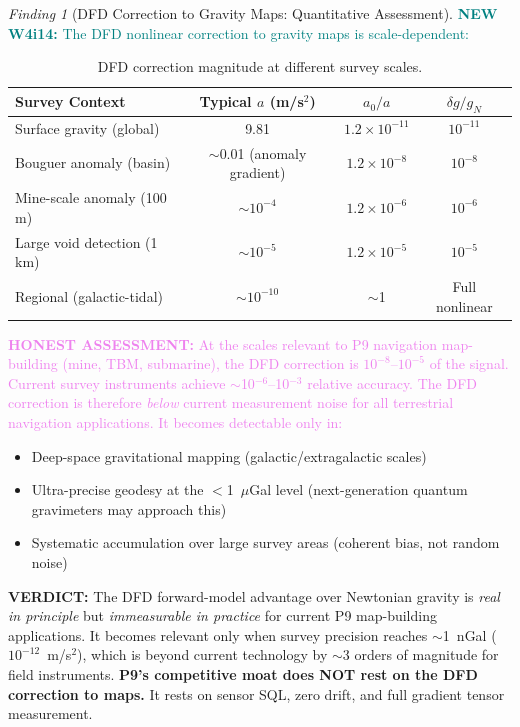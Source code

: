 \documentclass[11pt]{article}
\theoremstyle{definition}
\theoremstyle{remark}
\newtheorem{finding}[theorem]{Finding}
\newcommand{\ee}[1]{\times10^{#1}}
\newcommand{\honest}[1]{\textcolor{violet}{\textbf{HONEST ASSESSMENT:} #1}}
\newcommand{\verdict}[1]{\textcolor{green!50!black}{\textbf{VERDICT:} #1}}
\newcommand{\newfinding}[1]{\textcolor{teal}{\textbf{NEW W4i14:} #1}}
\begin{document}
\begin{finding}[DFD Correction to Gravity Maps: Quantitative Assessment]
\label{find:dfd-correction}
\newfinding{The DFD nonlinear correction to gravity maps is
scale-dependent:}

\begin{table}[H]
\centering
\caption{DFD correction magnitude at different survey scales.}
\label{tab:dfd-corrections}
\begin{tabular}{@{}lccc@{}}
\toprule
Survey Context & Typical $a$ (m/s$^2$) & $a_0/a$ & $\delta g/g_N$ \\
\midrule
Surface gravity (global) & 9.81 & $1.2\ee{-11}$ & $10^{-11}$ \\
Bouguer anomaly (basin) & $\sim$0.01 (anomaly gradient) & $1.2\ee{-8}$ & $10^{-8}$ \\
Mine-scale anomaly (100\,m) & $\sim$$10^{-4}$ & $1.2\ee{-6}$ & $10^{-6}$ \\
Large void detection (1\,km) & $\sim$$10^{-5}$ & $1.2\ee{-5}$ & $10^{-5}$ \\
Regional (galactic-tidal) & $\sim$$10^{-10}$ & $\sim$1 & Full nonlinear \\
\bottomrule
\end{tabular}
\end{table}

\honest{At the scales relevant to P9 navigation map-building (mine,
TBM, submarine), the DFD correction is $10^{-8}$--$10^{-5}$ of the
signal. Current survey instruments achieve $\sim$10$^{-6}$--10$^{-3}$
relative accuracy. The DFD correction is therefore \emph{below}
current measurement noise for all terrestrial navigation applications.
It becomes detectable only in:}
\begin{itemize}[nosep]
\item Deep-space gravitational mapping (galactic/extragalactic scales)
\item Ultra-precise geodesy at the $<$1~$\mu$Gal level (next-generation
  quantum gravimeters may approach this)
\item Systematic accumulation over large survey areas (coherent
  bias, not random noise)
\end{itemize}

\verdict{The DFD forward-model advantage over Newtonian gravity is
\emph{real in principle} but \emph{immeasurable in practice} for
current P9 map-building applications. It becomes relevant only when
survey precision reaches $\sim$1~nGal ($10^{-12}$~m/s$^2$), which
is beyond current technology by $\sim$3 orders of magnitude for
field instruments. \textbf{P9's competitive moat does NOT rest on
the DFD correction to maps.} It rests on sensor SQL, zero drift,
and full gradient tensor measurement.}
\end{finding}
\end{document}
